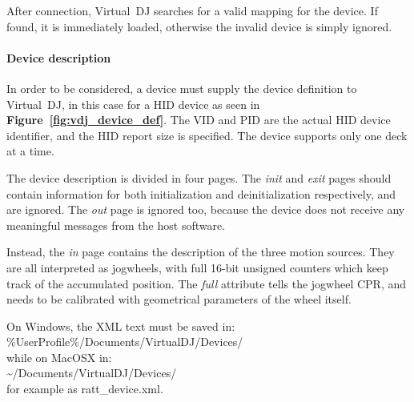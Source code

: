 \documentclass[a4paper,10pt]{article}
\newcommand{\citef}[1]{\textbf{Figure~\ref{#1}}}
\begin{document}
\begin{multicols}{2}
After connection, Virtual~DJ searches for a valid mapping for the device. If
found, it is immediately loaded, otherwise the invalid device is simply
ignored.


\paragraph{Device description}
In order to be considered, a device must supply the device definition to
Virtual~DJ, in this case for a HID device \cite{vdj_hiddef} as seen in
\citef{fig:vdj_device_def}. The VID and PID are the actual HID device
identifier, and the HID report size is specified. The device supports only one
deck at a time.

The device description is divided in four pages. The \emph{init} and
\emph{exit} pages should contain information for both initialization and
deinitialization respectively, and are ignored. The \emph{out} page is ignored
too, because the device does not receive any meaningful messages from the
host software.

Instead, the \emph{in} page contains the description of the three motion
sources. They are all interpreted as jogwheels, with full 16-bit unsigned
counters which keep track of the accumulated position. The \emph{full}
attribute tells the jogwheel CPR, and needs to be calibrated with geometrical
parameters of the wheel itself.

On Windows, the XML text must be saved in:\\
{\ttfamily\small {\%}UserProfile{\%}/Documents/VirtualDJ/Devices/}\\
while on MacOSX in:\\
{\ttfamily\small {\textasciitilde}/Documents/VirtualDJ/Devices/}\\
for example as {\ttfamily\small ratt{\_}device.xml}.


\end{multicols}
\end{document}
